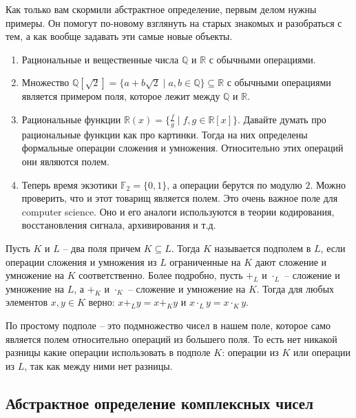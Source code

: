 Как только вам скормили абстрактное определение, первым делом нужны примеры. Он помогут по-новому взглянуть на старых знакомых и разобраться с тем, а как вообще задавать эти самые новые объекты.

\begin{enumerate}
\item Рациональные и вещественные числа $\mathbb Q$ и $\mathbb R$ с обычными операциями.

\item Множество $\mathbb Q[\sqrt{2}] = \{a + b \sqrt{2}\mid a,b\in\mathbb Q\}\subseteq \mathbb R$ с обычными операциями является примером поля, которое лежит между $\mathbb Q$ и $\mathbb R$.

\item Рациональные функции $\mathbb R(x) = \{\frac{f}{g}\mid f,g\in\mathbb R[x]\}$. Давайте думать про рациональные функции как про картинки. Тогда на них определены формальные операции сложения и умножения. Относительно этих операций они являются полем.

\item Теперь время экзотики $\mathbb F_2 =\{0, 1\}$, а операции берутся по модулю $2$. Можно проверить, что и этот товарищ является полем. Это очень важное поле для computer science. Оно и его аналоги используются в теории кодирования, восстановления сигнала, архивирования и т.д.
\end{enumerate}

\begin{definition}[Подполе]
Пусть $K$ и $L$ -- два поля причем $K \subseteq L$. Тогда $K$ называется подполем в $L$, если операции сложения и умножения из $L$ ограниченные на $K$ дают сложение и умножение на $K$ соответственно. Более подробно, пусть $+_L$ и $\cdot_L$ -- сложение и умножение на $L$, а $+_K$ и $\cdot_K$ -- сложение и умножение на $K$. Тогда для любых элементов $x,y\in K$ верно: $x +_L y = x+_K y$ и $x\cdot_L y = x \cdot_K y$.
\end{definition}

По простому подполе -- это подмножество чисел в нашем поле, которое само является полем относительно операций из большего поля. То есть нет никакой разницы какие операции использовать в подполе $K$: операции из $K$ или операции из $L$, так как между ними нет разницы.


\subsection{Абстрактное определение комплексных чисел}

